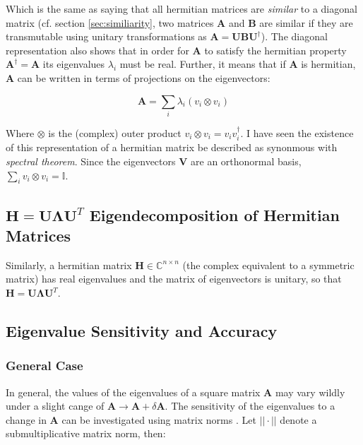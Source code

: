 Which is the same as saying that all hermitian matrices are \textit{similar} to a diagonal matrix (cf. section \ref{sec:similiarity}, two matrices $\mathbf{A}$ and $\mathbf{B}$ are similar if they are transmutable using unitary transformations as $\mathbf{A} = \mathbf{UBU^{\dagger}}$). The diagonal representation also shows that in order for $\mathbf{A}$ to satisfy the hermitian property $\mathbf{A}^{\dagger}=\mathbf{A}$ its eigenvalues $\lambda_i$ must be real. Further, it means that if $\mathbf{A}$ is hermitian, $\mathbf{A}$ can be written in terms of projections on the eigenvectors:

\begin{equation}
\mathbf{A} = \sum_i \lambda_i (v_i \otimes v_i)
\end{equation}

Where $\otimes$ is the (complex) outer product $v_i\otimes v_i = v_i v_i^{\dagger}$. I have seen the existence of this representation of a hermitian matrix be described as synonmous with \textit{spectral theorem}. Since the eigenvectors $\mathbf{V}$ are an orthonormal basis, $\sum_i v_i \otimes v_i = \mathbb{I}$.


\subsection{$\mathbf{H} = \mathbf{U\Lambda U}^T$ Eigendecomposition of Hermitian Matrices}

Similarly, a hermitian matrix $\mathbf{H} \in \mathbb{C}^{n\times n}$ (the complex equivalent to a symmetric matrix) has real eigenvalues and the matrix of eigenvectors is unitary, so that $\mathbf{H} = \mathbf{U\Lambda U}^T$.


\subsection{Eigenvalue Sensitivity and Accuracy}

\subsubsection{General Case}

In general, the values of the eigenvalues of a square matrix $\mathbf{A}$ may vary wildly under a slight cange of $\mathbf{A} \rightarrow \mathbf{A}+\delta\mathbf{A}$. The sensitivity of the eigenvalues to a change in $\mathbf{A}$ can be investigated using matrix norms \cite{mathworkseig}. Let $||\cdot||$ denote a submultiplicative matrix norm, then:

